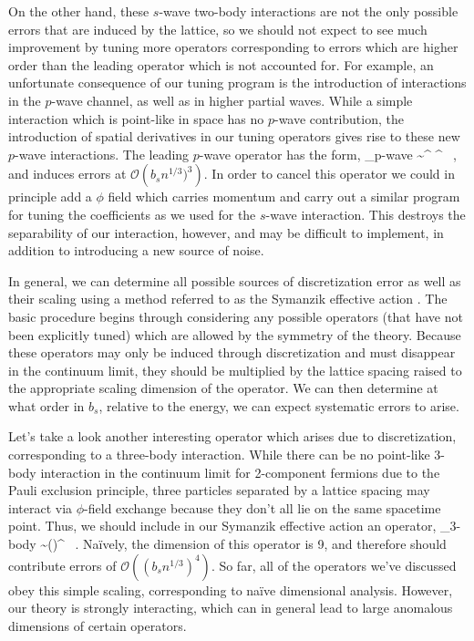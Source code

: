 On the other hand, these $s$-wave two-body interactions are not the only possible errors that are induced by the lattice, so we should not expect to see much improvement by tuning more operators corresponding to errors which are higher order than the leading operator which is not accounted for. For example, an unfortunate consequence of our tuning program is the introduction of interactions in the $p$-wave channel, as well as in higher partial waves. While a simple interaction which is point-like in space has no $p$-wave contribution, the introduction of spatial derivatives in our tuning operators gives rise to these new $p$-wave interactions. The leading $p$-wave operator has the form,
\beq
{}_{p\mbox{\tiny -wave}} \sim \psi^{\dagger} \mathbf{\nabla} \psi \cdot \psi^{\dagger} \mathbf{\nabla} \psi \ ,
\eeq
and induces errors at ${\mathcal{ O}}\left(b_s n^{1/3})^{3}\right)$. In order to cancel this operator we could in principle add a $\phi$ field which carries momentum and carry out a similar program for tuning the coefficients as we used for the $s$-wave interaction. This destroys the separability of our interaction, however, and may be difficult to implement, in addition to introducing a new source of noise.

In general, we can determine all possible sources of discretization error as well as their scaling using a method referred to as the Symanzik effective action \cite{Symanzik1,Symanzik2,Symanzik3,Symanzik4,EKLN4}. The basic procedure begins through considering any possible operators (that have not been explicitly tuned) which are allowed by the symmetry of the theory. Because these operators may only be induced through discretization and must disappear in the continuum limit, they should be multiplied by the lattice spacing raised to the appropriate scaling dimension of the operator. We can then determine at what order in $b_s$, relative to the energy, we can expect systematic errors to arise.

Let's take a look another interesting operator which arises due to discretization, corresponding to a three-body interaction. While there can be no point-like 3-body interaction in the continuum limit for 2-component fermions due to the Pauli exclusion principle, three particles separated by a lattice spacing may interact via $\phi$-field exchange because they don't all lie on the same spacetime point. Thus, we should include in our Symanzik effective action an operator,
\beq
{}_{\mbox{\tiny 3-body}} \sim \left(\psi \psi \psi \right)^{\dagger} \psi \psi \psi \ .
\eeq
Na\"ively, the dimension of this operator is 9, and therefore should contribute errors of ${\mathcal{ O}}\left((b_sn^{1/3})^4\right)$. So far, all of the operators we've discussed obey this simple scaling, corresponding to na\"ive dimensional analysis. However, our theory is strongly interacting, which can in general lead to large anomalous dimensions of certain operators. 

